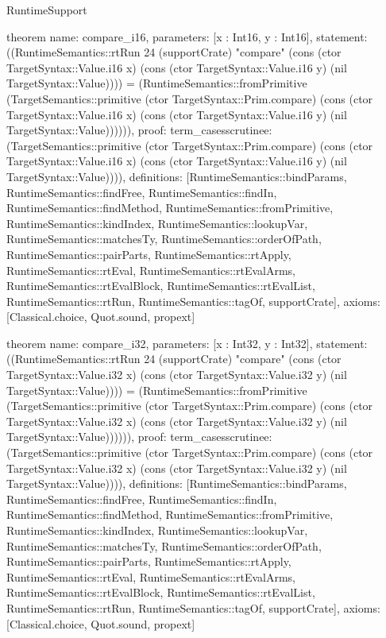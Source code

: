 \begin{lexlean}{RuntimeSupport}
\begin{semanticmodule}
theorem{
  name: compare_i16,
  parameters: [x : Int16, y : Int16],
  statement: ((RuntimeSemantics::rtRun 24 (supportCrate) "compare" (cons (ctor TargetSyntax::Value.i16 x) (cons (ctor TargetSyntax::Value.i16 y) (nil TargetSyntax::Value)))) = (RuntimeSemantics::fromPrimitive (TargetSemantics::primitive (ctor TargetSyntax::Prim.compare) (cons (ctor TargetSyntax::Value.i16 x) (cons (ctor TargetSyntax::Value.i16 y) (nil TargetSyntax::Value)))))),
  proof: term_cases{scrutinee: (TargetSemantics::primitive (ctor TargetSyntax::Prim.compare) (cons (ctor TargetSyntax::Value.i16 x) (cons (ctor TargetSyntax::Value.i16 y) (nil TargetSyntax::Value)))), definitions: [RuntimeSemantics::bindParams, RuntimeSemantics::findFree, RuntimeSemantics::findIn, RuntimeSemantics::findMethod, RuntimeSemantics::fromPrimitive, RuntimeSemantics::kindIndex, RuntimeSemantics::lookupVar, RuntimeSemantics::matchesTy, RuntimeSemantics::orderOfPath, RuntimeSemantics::pairParts, RuntimeSemantics::rtApply, RuntimeSemantics::rtEval, RuntimeSemantics::rtEvalArms, RuntimeSemantics::rtEvalBlock, RuntimeSemantics::rtEvalList, RuntimeSemantics::rtRun, RuntimeSemantics::tagOf, supportCrate]},
  axioms: [Classical.choice, Quot.sound, propext]
}

theorem{
  name: compare_i32,
  parameters: [x : Int32, y : Int32],
  statement: ((RuntimeSemantics::rtRun 24 (supportCrate) "compare" (cons (ctor TargetSyntax::Value.i32 x) (cons (ctor TargetSyntax::Value.i32 y) (nil TargetSyntax::Value)))) = (RuntimeSemantics::fromPrimitive (TargetSemantics::primitive (ctor TargetSyntax::Prim.compare) (cons (ctor TargetSyntax::Value.i32 x) (cons (ctor TargetSyntax::Value.i32 y) (nil TargetSyntax::Value)))))),
  proof: term_cases{scrutinee: (TargetSemantics::primitive (ctor TargetSyntax::Prim.compare) (cons (ctor TargetSyntax::Value.i32 x) (cons (ctor TargetSyntax::Value.i32 y) (nil TargetSyntax::Value)))), definitions: [RuntimeSemantics::bindParams, RuntimeSemantics::findFree, RuntimeSemantics::findIn, RuntimeSemantics::findMethod, RuntimeSemantics::fromPrimitive, RuntimeSemantics::kindIndex, RuntimeSemantics::lookupVar, RuntimeSemantics::matchesTy, RuntimeSemantics::orderOfPath, RuntimeSemantics::pairParts, RuntimeSemantics::rtApply, RuntimeSemantics::rtEval, RuntimeSemantics::rtEvalArms, RuntimeSemantics::rtEvalBlock, RuntimeSemantics::rtEvalList, RuntimeSemantics::rtRun, RuntimeSemantics::tagOf, supportCrate]},
  axioms: [Classical.choice, Quot.sound, propext]
}


\end{semanticmodule}
\end{lexlean}
